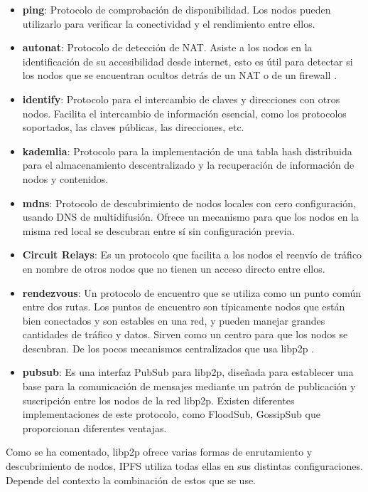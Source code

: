 \begin{itemize}[itemsep=1pt,nolistsep]
      \item \textbf{ping}: Protocolo de comprobación de disponibilidad. Los nodos pueden utilizarlo para verificar la conectividad y el rendimiento entre ellos.
      \item \textbf{autonat}: Protocolo de detección de NAT. Asiste a los nodos en la identificación de su accesibilidad desde internet, esto es útil para detectar si los nodos que se encuentran ocultos detrás de un NAT o de un firewall \cite{AutoNAT}.
      \item \textbf{identify}: Protocolo para el intercambio de claves y direcciones con otros nodos. Facilita el intercambio de información esencial, como los protocolos soportados, las claves públicas, las direcciones, etc.
      \item \textbf{kademlia}: Protocolo para la implementación de una tabla hash distribuida para el almacenamiento descentralizado y la recuperación de información de nodos y contenidos.
      \item \textbf{mdns}: Protocolo de descubrimiento de nodos locales con cero configuración, usando DNS de multidifusión. Ofrece un mecanismo para que los nodos en la misma red local se descubran entre sí sin configuración previa.
      \item \textbf{Circuit Relays}: Es un protocolo que facilita a los nodos el reenvío de tráfico en nombre de otros nodos que no tienen un acceso directo entre ellos\cite{CircuitRelay}.
      \item \textbf{rendezvous}: Un protocolo de encuentro que se utiliza como un punto común entre dos rutas.
            Los puntos de encuentro son típicamente nodos que están bien conectados y son estables en una red, y pueden manejar grandes cantidades de tráfico y datos. Sirven como un centro para que los nodos se descubran. De los pocos mecanismos centralizados que usa libp2p \cite{Rendezvous}.
      \item \textbf{pubsub}: Es una interfaz PubSub para libp2p, diseñada para establecer una base para la comunicación de mensajes mediante un patrón de publicación y suscripción entre los nodos de la red libp2p. Existen diferentes implementaciones de este protocolo, como FloodSub, GossipSub que proporcionan
            diferentes ventajas.
\end{itemize}

Como se ha comentado, libp2p ofrece varias formas de enrutamiento y descubrimiento de nodos, IPFS utiliza todas ellas en sus distintas
configuraciones. Depende del contexto la combinación de estos que se use.

